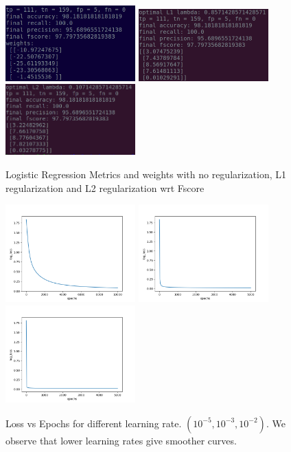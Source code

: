 \documentclass[a4paper,10pt,twoside]{article}
\begin{document}
\begin{figure}[h!]
\centering
\includegraphics[scale=1.0, width=5cm]{Fig3.png}
\includegraphics[scale=1.0, width=5cm]{Fig6.png}
\includegraphics[scale=1.0, width=5cm]{Fig7.png}
\caption*{Logistic Regression Metrics and weights with no regularization, L1 regularization and L2 regularization wrt Fscore}
\end{figure}

\begin{figure}[h!]
\centering
\includegraphics[scale=1.0, width=5cm]{Fig11.png}
\includegraphics[scale=1.0, width=5cm]{Fig12.png}
\includegraphics[scale=1.0, width=5cm]{Fig13.png}
\caption*{Loss vs Epochs for different learning rate. $(10^{-5}, 10^{-3}, 10^{-2})$. We observe that lower learning rates give smoother curves.}
\end{figure}
\end{document}
